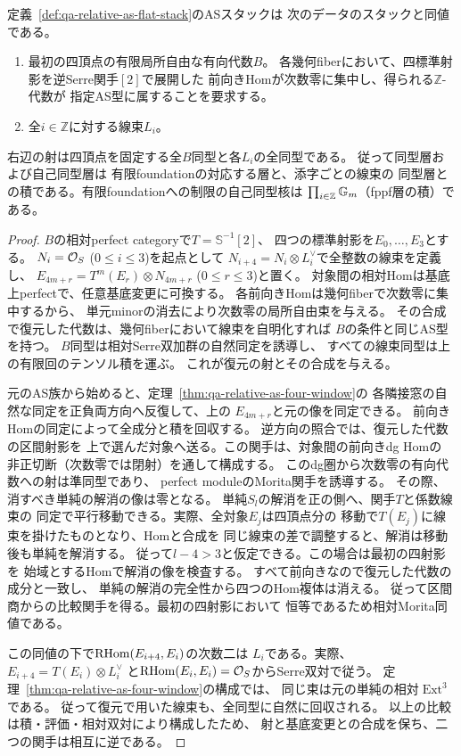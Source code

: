 \begin{corollary}[全整数AS代数の相対復元と同型層]
\label{cor:qa-relative-as-line-decorated-foundation}
定義~\ref{def:qa-relative-as-flat-stack}のASスタックは
次のデータのスタックと同値である。
\begin{enumerate}
\item 最初の四頂点の有限局所自由な有向代数$B$。
各幾何fiberにおいて、四標準射影を逆Serre関手$[2]$で展開した
前向きHomが次数零に集中し、得られる$\mathbb Z$-代数が
指定AS型に属することを要求する。
\item 全$i\in\mathbb Z$に対する線束$L_i$。
\end{enumerate}
右辺の射は四頂点を固定する全$B$同型と各$L_i$の全同型である。
従って同型層および自己同型層は
有限foundationの対応する層と、添字ごとの線束の
同型層との積である。有限foundationへの制限の自己同型核は
$\prod_{i\in\mathbb Z}\mathbb G_m$（fppf層の積）である。
\end{corollary}
\begin{proof}
$B$の相対perfect categoryで$T=\mathbb S^{-1}[2]$、
四つの標準射影を$E_0,\ldots,E_3$とする。
$N_i=\mathcal O_S$ ($0\le i\le3$)を起点として
$N_{i+4}=N_i\otimes L_i^\vee$で全整数の線束を定義し、
$E_{4m+r}=T^m(E_r)\otimes N_{4m+r}$ ($0\le r\le3$)と置く。
対象間の相対Homは基底上perfectで、任意基底変更に可換する。
各前向きHomは幾何fiberで次数零に集中するから、
単元minorの消去により次数零の局所自由束を与える。
その合成で復元した代数は、幾何fiberにおいて線束を自明化すれば
$B$の条件と同じAS型を持つ。
$B$同型は相対Serre双加群の自然同定を誘導し、
すべての線束同型は上の有限回のテンソル積を運ぶ。
これが復元の射とその合成を与える。

元のAS族から始めると、定理~\ref{thm:qa-relative-as-four-window}の
各隣接窓の自然な同定を正負両方向へ反復して、上の
$E_{4m+r}$と元の像を同定できる。
前向きHomの同定によって全成分と積を回収する。
逆方向の照合では、復元した代数の区間射影を
上で選んだ対象へ送る。この関手は、対象間の前向きdg Homの
非正切断（次数零では閉射）を通して構成する。
このdg圏から次数零の有向代数への射は準同型であり、
perfect moduleのMorita関手を誘導する。
その際、消すべき単純の解消の像は零となる。
単純$S_l$の解消を正の側へ、関手$T$と係数線束の
同定で平行移動できる。実際、全対象$E_j$は四頂点分の
移動で$T(E_j)$に線束を掛けたものとなり、Homと合成を
同じ線束の差で調整すると、解消は移動後も単純を解消する。
従って$l-4>3$と仮定できる。この場合は最初の四射影を
始域とするHomで解消の像を検査する。
すべて前向きなので復元した代数の成分と一致し、
単純の解消の完全性から四つのHom複体は消える。
従って区間商からの比較関手を得る。最初の四射影において
恒等であるため相対Morita同値である。

この同値の下で$\operatorname{RHom}(E_{i+4},E_i)$の次数二は
$L_i$である。実際、$E_{i+4}=T(E_i)\otimes L_i^\vee$
と$\operatorname{RHom}(E_i,E_i)=\mathcal O_S$からSerre双対で従う。
定理~\ref{thm:qa-relative-as-four-window}の構成では、
同じ束は元の単純の相対$\operatorname{Ext}^3$である。
従って復元で用いた線束も、全同型に自然に回収される。
以上の比較は積・評価・相対双対により構成したため、
射と基底変更との合成を保ち、二つの関手は相互に逆である。
\end{proof}

